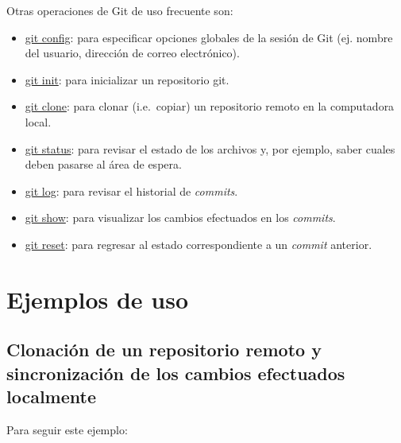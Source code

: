 \documentclass[
  letterpaper,
  DIV=11,
  numbers=noendperiod]{scrreprt}
\providecommand{\tightlist}{%
  \setlength{\itemsep}{0pt}\setlength{\parskip}{0pt}}\usepackage{longtable,booktabs,array}
\begin{document}
Otras operaciones de Git de uso frecuente son:

\begin{itemize}
\tightlist
\item
  \href{https://git-scm.com/docs/git-config}{git config}: para
  especificar opciones globales de la sesión de Git (ej. nombre del
  usuario, dirección de correo electrónico).
\item
  \href{https://git-scm.com/docs/git-init}{git init}: para inicializar
  un repositorio git.
\item
  \href{https://git-scm.com/docs/git-clone}{git clone}: para clonar
  (i.e.~copiar) un repositorio remoto en la computadora local.
\item
  \href{https://git-scm.com/docs/git-status}{git status}: para revisar
  el estado de los archivos y, por ejemplo, saber cuales deben pasarse
  al área de espera.
\item
  \href{https://git-scm.com/docs/git-log}{git log}: para revisar el
  historial de \emph{commits}.
\item
  \href{https://git-scm.com/docs/git-show}{git show}: para visualizar
  los cambios efectuados en los \emph{commits}.
\item
  \href{https://git-scm.com/docs/git-reset}{git reset}: para regresar al
  estado correspondiente a un \emph{commit} anterior.
\end{itemize}

\hypertarget{ejemplos-de-uso}{%
\section{Ejemplos de uso}\label{ejemplos-de-uso}}

\hypertarget{clonaciuxf3n-de-un-repositorio-remoto-y-sincronizaciuxf3n-de-los-cambios-efectuados-localmente}{%
\subsection{Clonación de un repositorio remoto y sincronización de los
cambios efectuados
localmente}\label{clonaciuxf3n-de-un-repositorio-remoto-y-sincronizaciuxf3n-de-los-cambios-efectuados-localmente}}

Para seguir este ejemplo:
\end{document}
